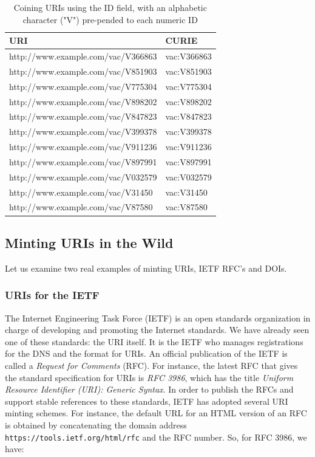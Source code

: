 \begin{table}
    \centering
    \begin{tabular}{|l l|}
    \hline
    URI&CURIE \\
    \hline\hline
http://www.example.com/vac/V366863&vac:V366863 \\
http://www.example.com/vac/V851903&vac:V851903 \\
http://www.example.com/vac/V775304&vac:V775304 \\
http://www.example.com/vac/V898202&vac:V898202 \\
http://www.example.com/vac/V847823&vac:V847823 \\
http://www.example.com/vac/V399378&vac:V399378 \\
http://www.example.com/vac/V911236&vac:V911236 \\
http://www.example.com/vac/V897991&vac:V897991 \\
http://www.example.com/vac/V032579&vac:V032579 \\
http://www.example.com/vac/V31450&vac:V31450 \\
http://www.example.com/vac/V87580&vac:V87580 \\
\hline
    \end{tabular}
    \caption{Coining URIs using the ID field, with an alphabetic character ("V") pre-pended to each numeric ID }
    \label{tab:ch5.vac}
\end{table}

\subsection{Minting URIs in the Wild}
Let us examine two real examples of minting URIs, IETF RFC's and DOIs. 

\subsubsection{URIs for the IETF}
The Internet Engineering Task Force (IETF) is an open
standards organization in charge of developing and promoting the
Internet standards. We have already seen   one of these standards: the URI itself.  It is the IETF who manages registrations for the DNS and the format for URIs.
An official publication of the IETF is   called a \emph{Request
for Comments} (RFC). For instance, the latest RFC that gives the standard specification for
URIs is
\emph{RFC 3986}, which has the title  \emph{Uniform Resource Identifier (URI): Generic Syntax}.
In order to publish the RFCs and support stable references to these
standards, IETF has adopted several URI minting schemes. For instance,
the default URL for an HTML version of an RFC is obtained by concatenating the
domain address \texttt{https://tools.ietf.org/html/rfc} and the RFC number. So, for RFC 3986, we have:

